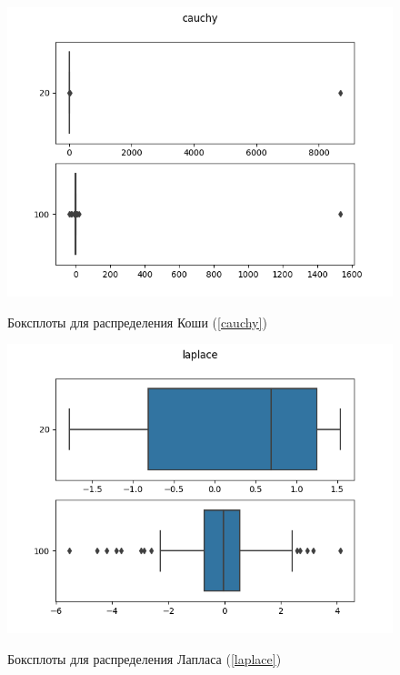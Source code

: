 \documentclass[12pt,a4paper]{article}
\begin{document}
			\begin{figure}[htp]
				{\includegraphics[width=1\linewidth]{../plots/cauchy.png}}
				\caption{Боксплоты для распределения Коши (\ref{cauchy})}
			\end{figure}
			\newpage
			
			\begin{figure}[htp]
				{\includegraphics[width=1\linewidth]{../plots/laplace.png}}
				\caption{Боксплоты для распределения Лапласа (\ref{laplace})}	
			\end{figure}
			\newpage
		
\end{document}
